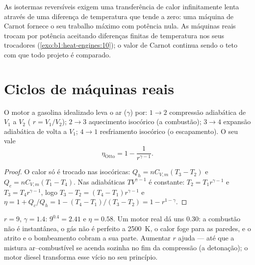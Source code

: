 \begin{remark}\label{rem:b1:heat-engines:notengine}
As isotermas reversíveis exigem uma transferência de calor infinitamente
lenta através de uma diferença de temperatura que tende a zero: uma máquina
de Carnot fornece o seu trabalho máximo com potência nula. As máquinas
reais trocam  por potência aceitando diferenças finitas de
temperatura nos seus trocadores (\cref{exo:b1:heat-engines:10}); o valor de
Carnot continua sendo o teto com que todo projeto é comparado.
\end{remark}

\section{Ciclos de máquinas reais}

\begin{proposition}\label{prop:b1:heat-engines:otto}
O motor a gasolina idealizado leva o ar ($\gamma$) por: $1 \to 2$
compressão adiabática de $V_1$ a $V_2$ (\emph{}
$r = V_1/V_2$); $2 \to 3$ aquecimento isocórico (a combustão); $3 \to 4$
expansão adiabática de volta a $V_1$; $4 \to 1$ resfriamento isocórico (o
escapamento). O seu  vale
\[
\eta_{\text{Otto}} = 1 - \frac{1}{r^{\gamma-1}} .
\]
\end{proposition}

\begin{proof}
O calor só é trocado nas isocóricas: $Q_h = nC_{V,m}(T_3 - T_2)$ e
$Q_c = nC_{V,m}(T_1 - T_4)$. Nas adiabáticas $TV^{\gamma-1}$ é constante:
$T_2 = T_1r^{\gamma-1}$ e $T_3 = T_4r^{\gamma-1}$, logo $T_3 - T_2 =
(T_4 - T_1)r^{\gamma-1}$ e
$\eta = 1 + Q_c/Q_h = 1 - (T_4 - T_1)/(T_3 - T_2) = 1 - r^{1-\gamma}$.
\end{proof}

\begin{example}\label{ex:b1:heat-engines:ottonumbers}
$r = 9$, $\gamma = 1.4$: $9^{0.4} = 2.41$ e $\eta = 0.58$. Um motor real dá
uns $0.30$: a combustão não é instantânea, o gás não é perfeito a
\qty{2500}{K}, o calor foge para as paredes, e o atrito e o bombeamento
cobram a sua parte. Aumentar $r$ ajuda --- até que a mistura ar--combustível
se acenda sozinha no fim da compressão (a detonação); o motor diesel
transforma esse vício no seu princípio.
\end{example}

